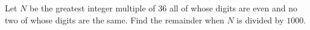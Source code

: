 Let $ N$ be the greatest integer multiple of $ 36$ all of whose digits are even and no two of whose digits are the same. Find the remainder when $ N$ is divided by $ 1000$.